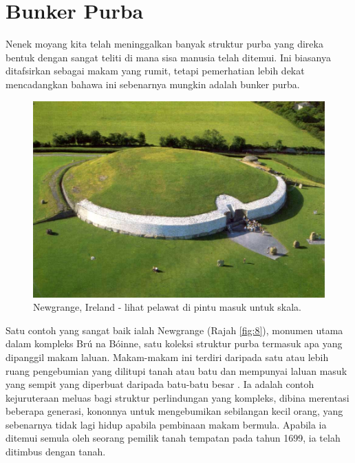 \documentclass[10pt,twocolumn,letterpaper]{article}
\begin{document}
\section{Bunker Purba}

Nenek moyang kita telah meninggalkan banyak struktur purba yang direka bentuk dengan sangat teliti di mana sisa manusia telah ditemui. Ini biasanya ditafsirkan sebagai makam yang rumit, tetapi pemerhatian lebih dekat mencadangkan bahawa ini sebenarnya mungkin adalah bunker purba.

\begin{figure}[b]
\begin{center}
   \includegraphics[width=1\linewidth]{ww19.jpg}
\end{center}
   \caption{Newgrange, Ireland - lihat pelawat di pintu masuk untuk skala.}
\label{fig:8}
\label{fig:onecol}
\end{figure}

Satu contoh yang sangat baik ialah Newgrange (Rajah \ref{fig:8}), monumen utama dalam kompleks Brú na Bóinne, satu koleksi struktur purba termasuk apa yang dipanggil makam laluan. Makam-makam ini terdiri daripada satu atau lebih ruang pengebumian yang dilitupi tanah atau batu dan mempunyai laluan masuk yang sempit yang diperbuat daripada batu-batu besar \cite{70}. Ia adalah contoh kejuruteraan meluas bagi struktur perlindungan yang kompleks, dibina merentasi beberapa generasi, kononnya untuk mengebumikan sebilangan kecil orang, yang sebenarnya tidak lagi hidup apabila pembinaan makam bermula. Apabila ia ditemui semula oleh seorang pemilik tanah tempatan pada tahun 1699, ia telah ditimbus dengan tanah.
\end{document}
